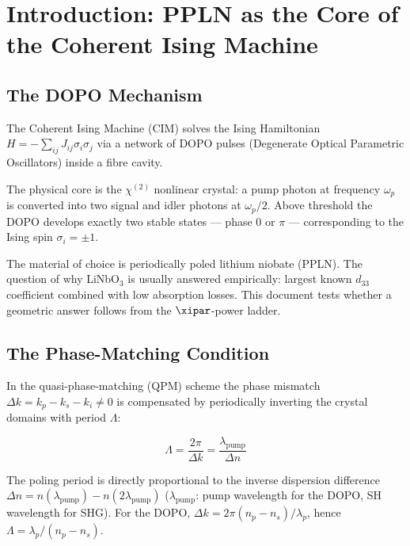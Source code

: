 \clearpage

\section{Introduction: PPLN as the Core of the Coherent Ising Machine}
\label{sec:intro}

\subsection{The DOPO Mechanism}

The Coherent Ising Machine (CIM) solves the Ising Hamiltonian
$H = -\sum_{ij} J_{ij}\sigma_i\sigma_j$ via a network of DOPO pulses
(Degenerate Optical Parametric Oscillators) inside a fibre cavity.

The physical core is the $\chi^{(2)}$ nonlinear crystal: a pump photon at
frequency $\omega_p$ is converted into two signal and idler photons at
$\omega_p/2$. Above threshold the DOPO develops exactly two stable states
— phase 0 or $\pi$ — corresponding to the Ising spin $\sigma_i = \pm 1$.

The material of choice is periodically poled lithium niobate (PPLN). The
question of why LiNbO$_3$ is usually answered empirically: largest known
$d_{33}$ coefficient combined with low absorption losses. This document
tests whether a geometric answer follows from the $\xipar$-power ladder.

\subsection{The Phase-Matching Condition}

In the quasi-phase-matching (QPM) scheme the phase mismatch
$\Delta k = k_p - k_s - k_i \neq 0$ is compensated by periodically
inverting the crystal domains with period $\Lambda$:

\begin{equation}
    \Lambda = \frac{2\pi}{\Delta k} = \frac{\lambda_{\text{pump}}}{\Delta n}
    \label{eq:poling}
\end{equation}

The poling period is directly proportional to the inverse dispersion
difference $\Delta n = n(\lambda_{\text{pump}}) - n(2\lambda_{\text{pump}})$ ($\lambda_{\text{pump}}$: pump wavelength for the DOPO, SH wavelength for SHG).
For the DOPO, $\Delta k = 2\pi(n_p - n_s)/\lambda_p$, hence $\Lambda = \lambda_p/(n_p - n_s)$.

